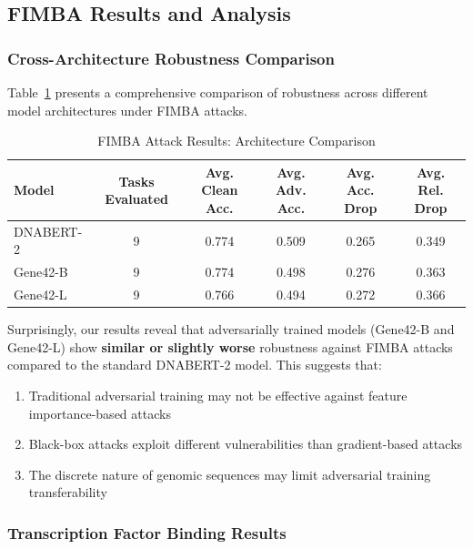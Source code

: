 \documentclass{article} %
\begin{document}
\subsection{FIMBA Results and Analysis}

\subsubsection{Cross-Architecture Robustness Comparison}

Table~\ref{tab:fimba_architecture_comparison} presents a comprehensive comparison of robustness across different model architectures under FIMBA attacks.

\begin{table}[h]
\centering
\caption{FIMBA Attack Results: Architecture Comparison}
\label{tab:fimba_architecture_comparison}
\begin{tabular}{lccccc}
\toprule
\textbf{Model} & \textbf{Tasks Evaluated} & \textbf{Avg. Clean Acc.} & \textbf{Avg. Adv. Acc.} & \textbf{Avg. Acc. Drop} & \textbf{Avg. Rel. Drop} \\
\midrule
DNABERT-2 & 9 & 0.774 & 0.509 & 0.265 & 0.349 \\
Gene42-B & 9 & 0.774 & 0.498 & 0.276 & 0.363 \\
Gene42-L & 9 & 0.766 & 0.494 & 0.272 & 0.366 \\
\bottomrule
\end{tabular}
\end{table}

Surprisingly, our results reveal that adversarially trained models (Gene42-B and Gene42-L) show \textbf{similar or slightly worse} robustness against FIMBA attacks compared to the standard DNABERT-2 model. This suggests that:

\begin{enumerate}
    \item Traditional adversarial training may not be effective against feature importance-based attacks
    \item Black-box attacks exploit different vulnerabilities than gradient-based attacks
    \item The discrete nature of genomic sequences may limit adversarial training transferability
\end{enumerate}

\subsubsection{Transcription Factor Binding Results}
\end{document}
